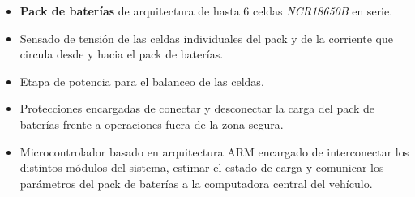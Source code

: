 \documentclass[10pt,a4paper]{article}
\begin{document}
	\begin{itemize}
		\item \textbf{Pack de baterías} de arquitectura de hasta 6 celdas \emph{NCR18650B} en serie.
		\item Sensado de tensión de las celdas individuales del pack y de la corriente que circula desde y hacia el pack de baterías.
		\item Etapa de potencia para el balanceo de las celdas.
		\item Protecciones encargadas de conectar y desconectar la carga del pack de baterías frente a operaciones fuera de la zona segura. 
		\item Microcontrolador basado en arquitectura ARM encargado de interconectar los distintos módulos del sistema, estimar el estado de carga y comunicar los parámetros del pack de baterías a la computadora central del vehículo.
	\end{itemize}
	
	\clearpage
	
\end{document}
